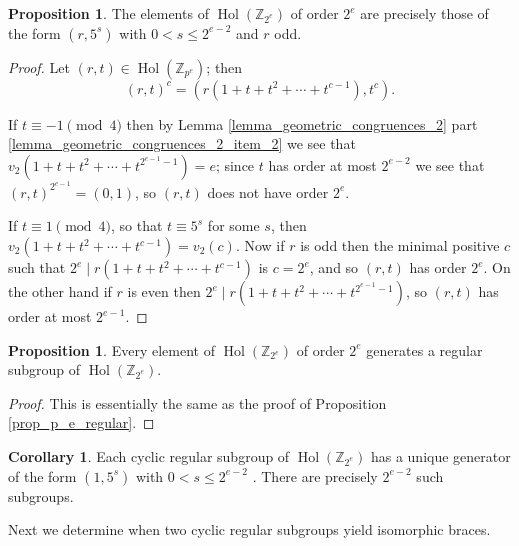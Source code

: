\documentclass[reqno]{amsart}
\theoremstyle{definition}
\newtheorem{proposition}[theorem]{Proposition}
\newtheorem{corollary}[theorem]{Corollary}
\newcommand{\Z}{\mathbb{Z}}
\DeclareMathOperator{\Hol}{\mbox{Hol}}
\begin{document}
\begin{proposition} \label{prop_2_e_order} %
The elements of $ \Hol(\Z_{2^{e}}) $ of order $ 2^{e} $ are precisely those of the form $ (r,5^{s}) $ with $ 0 < s \leq 2^{e-2} $ and $ r $ odd. 
\end{proposition}
\begin{proof}
Let $ (r,t) \in \Hol(\Z_{p^{e}}) $; then
\[ (r,t)^{c} = (r(1+t+t^{2}+\cdots + t^{c-1}),t^{c}). \]

If $ t \equiv -1 \pmod{4} $ then by Lemma \ref{lemma_geometric_congruences_2} part \ref{lemma_geometric_congruences_2_item_2} we see that $ v_{2}(1+t+t^{2}+\cdots + t^{2^{e-1}-1})=e $; since $ t $ has order at most $ 2^{e-2} $ we see that $ (r,t)^{2^{e-1}} = (0,1) $, so $ (r,t) $ does not have order $ 2^{e} $. 

If $ t \equiv 1 \pmod{4} $, so that $ t \equiv 5^{s} $ for some $ s $, then $ v_{2}(1+t+t^{2}+\cdots + t^{c-1})=v_{2}(c) $. Now if $ r $ is odd then the minimal positive $ c $ such that $ 2^{e} \mid r(1+t+t^{2}+\cdots + t^{c-1}) $ is $ c=2^{e} $, and so $ (r,t) $ has order $ 2^{e} $. On the other hand if $ r $ is even then $ 2^{e} \mid r(1+t+t^{2}+\cdots + t^{2^{e-1}-1}) $, so $ (r,t) $ has order at most $ 2^{e-1} $.
\end{proof}


\begin{proposition} \label{prop_2_e_regular} 
Every element of $ \Hol(\Z_{2^{e}}) $ of order $ 2^{e} $ generates a regular subgroup of $ \Hol(\Z_{2^{e}}) $. 
\end{proposition}
\begin{proof}
This is essentially the same as the proof of Proposition \ref{prop_p_e_regular}. 
\end{proof}

\begin{corollary}
Each cyclic regular subgroup of $ \Hol(\Z_{2^{e}}) $ has a unique generator of the form $ (1,5^{s}) $ with $ 0 < s \leq 2^{e-2} $ . There are precisely $ 2^{e-2} $ such subgroups. 
\end{corollary}

Next we determine when two cyclic regular subgroups yield isomorphic braces. 
\end{document}
